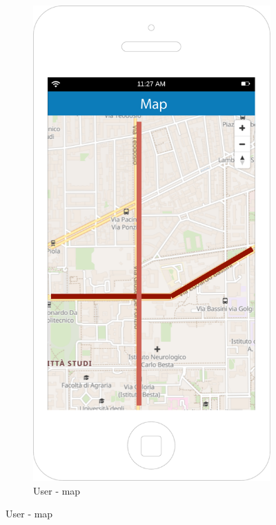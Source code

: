 \documentclass[12pt,a4paper]{report}
\begin{document}
		\begin{figure}[H]
		\begin{subfigure}{0.5\textwidth}
		\setcounter{subfigure}{4}
			\includegraphics[scale=0.25, center]{Map}
			\caption{User -  map}
			\label{fig:subim2}

\end{subfigure}
\end{figure}
\end{document}
